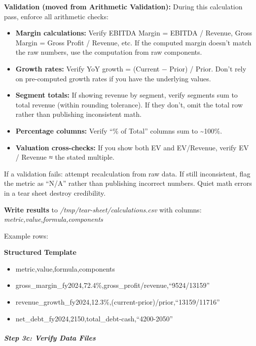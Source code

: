 \documentclass[11pt]{article}
\begin{document}
\textbf{Validation (moved from Arithmetic Validation):} During this calculation pass, enforce all arithmetic checks:


\begin{itemize}[leftmargin=*,itemsep=2pt,topsep=2pt]
\item {} \textbf{Margin calculations:} Verify EBITDA Margin = EBITDA / Revenue, Gross Margin = Gross Profit / Revenue, etc. If the computed margin doesn't match the raw numbers, use the computation from raw components.
\item {} \textbf{Growth rates:} Verify YoY growth = (Current − Prior) / Prior. Don't rely on pre-computed growth rates if you have the underlying values.
\item {} \textbf{Segment totals:} If showing revenue by segment, verify segments sum to total revenue (within rounding tolerance). If they don't, omit the total row rather than publishing inconsistent math.
\item {} \textbf{Percentage columns:} Verify ``\% of Total'' columns sum to \textasciitilde{}100\%.
\item {} \textbf{Valuation cross-checks:} If you show both EV and EV/Revenue, verify EV / Revenue ≈ the stated multiple.
\end{itemize}

If a validation fails: attempt recalculation from raw data. If still inconsistent, flag the metric as ``N/A'' rather than publishing incorrect numbers. Quiet math errors in a tear sheet destroy credibility.


\textbf{Write results} to \emph{/tmp/tear-sheet/calculations.csv} with columns: \emph{metric,value,formula,components}


Example rows:

\textbf{Structured Template}
\begin{itemize}[leftmargin=*,itemsep=2pt,topsep=2pt]
\item {} metric,value,formula,components
\item {} gross\_\allowbreak{}margin\_\allowbreak{}fy2024,72.4\%,gross\_\allowbreak{}profit/revenue,``9524/13159''
\item {} revenue\_\allowbreak{}growth\_\allowbreak{}fy2024,12.3\%,(current-prior)/prior,``13159/11716''
\item {} net\_\allowbreak{}debt\_\allowbreak{}fy2024,2150,total\_\allowbreak{}debt-cash,``4200-2050''
\end{itemize}

\subparagraph{Step 3c: Verify Data Files}\mbox{}\par
\end{document}
